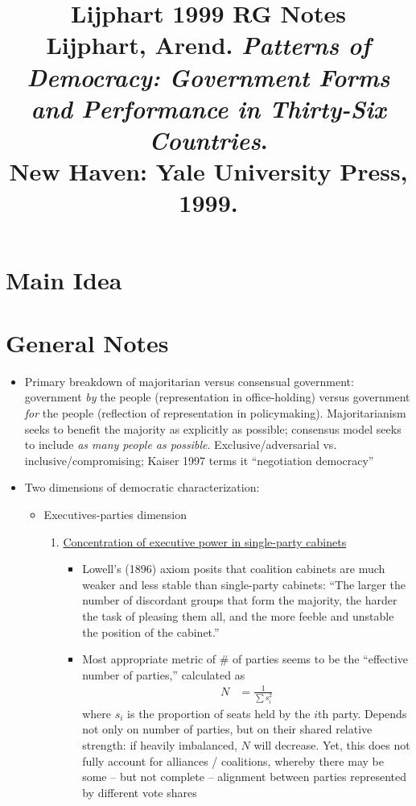 \documentclass[12pt]{article}
\title{\textbf{Lijphart 1999 RG Notes}\\
\large Lijphart, Arend. \textit{Patterns of Democracy: Government Forms and Performance in Thirty-Six Countries}.\\
New Haven: Yale University Press, 1999.}
\author{}
\date{}
\begin{document}
\maketitle

\section{Main Idea}



\section{General Notes}

\begin{itemize}[leftmargin=*, itemsep=4pt]
    \item Primary breakdown of majoritarian versus consensual government: government \emph{by} the people (representation in office-holding) versus government \emph{for} the people (reflection of representation in policymaking). Majoritarianism seeks to benefit the majority as explicitly as possible; consensus model seeks to include \emph{as many people as possible}. Exclusive/adversarial vs. inclusive/compromising; Kaiser 1997 terms it ``negotiation democracy''
    \item Two dimensions of democratic characterization:
    \begin{itemize}
        \item Executives-parties dimension
        \begin{enumerate}
            \item \underline{Concentration of executive power in single-party cabinets}
            \begin{itemize}
                \item Lowell's (1896) axiom posits that coalition cabinets are much weaker and less stable than single-party cabinets: ``The larger the number of discordant groups that form the majority, the harder the task of pleasing them all, and the more feeble and unstable the position of the cabinet.''
                \item Most appropriate metric of \# of parties seems to be the ``effective number of parties,'' calculated as 
                \begin{align*}
                    N &= \frac{1}{\sum s_i^2}
                \end{align*}
                where $s_i$ is the proportion of seats held by the $i$th party. Depends not only on number of parties, but on their shared relative strength: if heavily imbalanced, $N$ will decrease. Yet, this does not fully account for alliances / coalitions, whereby there may be some -- but not complete -- alignment between parties represented by different vote shares

\end{itemize}
\end{enumerate}
\end{itemize}
\end{itemize}
\end{document}
